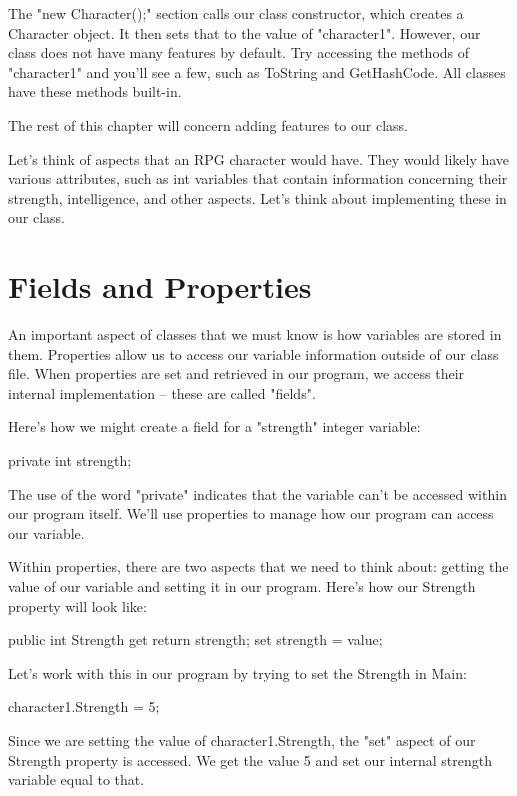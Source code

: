 \documentclass[oneside, openany] {book}
\begin{document}
The "new Character();" section calls our class constructor, which creates a Character object. It then sets that to the value of "character1".
However, our class does not have many features by default. Try accessing the methods of "character1" and you'll see a few, such as ToString and GetHashCode. All classes have these methods built-in.

The rest of this chapter will concern adding features to our class.

Let's think of aspects that an RPG character would have. They would likely have various attributes, such as int variables that contain information concerning their strength, intelligence, and other aspects. Let's think about implementing these in our class.

\section{Fields and Properties}
An important aspect of classes that we must know is how variables are stored in them. Properties allow us to access our variable information outside of our class file. When properties are set and retrieved in our program, we access their internal implementation -- these are called "fields".

Here's how we might create a field for a "strength" integer variable:

\begin{CSharp}
private int strength;
\end{CSharp}

The use of the word "private" indicates that the variable can't be accessed within our program itself. We'll use properties to manage how our program can access our variable.

Within properties, there are two aspects that we need to think about: getting the value of our variable and setting it in our program. Here's how our Strength property will look like:

\begin{CSharp}
public int Strength
    {
        get { return strength; }
        set { strength = value; }
    }
\end{CSharp}

Let's work with this in our program by trying to set the Strength in Main:

\begin{CSharp}
character1.Strength = 5;
\end{CSharp}

Since we are setting the value of character1.Strength, the "set" aspect of our Strength property is accessed. We get the value 5 and set our internal strength variable equal to that.
\end{document}
